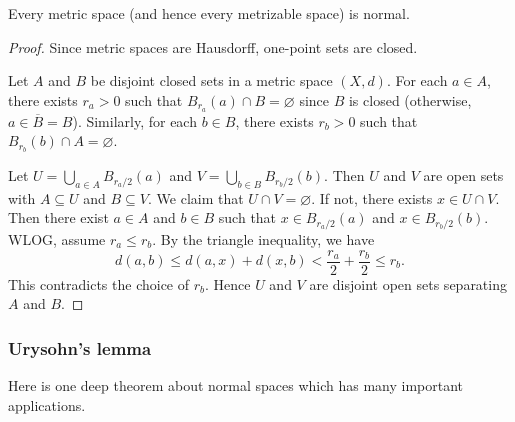 \begin{theorem}
    Every metric space (and hence every metrizable space) is normal. 
\end{theorem}
\begin{proof}
    Since metric spaces are Hausdorff, one-point sets are closed. 

    Let $A$ and $B$ be disjoint closed sets in a metric space $(X,d)$. For each $a\in A$, there exists $r_a>0$ such that $B_{r_a}(a)\cap B=\varnothing$ since $B$ is closed (otherwise, $a\in \overline{B}=B$). Similarly, for each $b\in B$, there exists $r_b>0$ such that $B_{r_b}(b)\cap A=\varnothing$.

    Let $U=\bigcup_{a\in A} B_{r_a/2}(a)$ and $V=\bigcup_{b\in B} B_{r_b/2}(b)$. Then $U$ and $V$ are open sets with $A\subseteq U$ and $B\subseteq V$. We claim that $U\cap V=\varnothing$. If not, there exists $x\in U\cap V$. Then there exist $a\in A$ and $b\in B$ such that $x\in B_{r_a/2}(a)$ and $x\in B_{r_b/2}(b)$.
    WLOG, assume $r_a\le r_b$.
    By the triangle inequality, we have
    \[d(a,b)\le d(a,x)+d(x,b)<\frac{r_a}{2}+\frac{r_b}{2}\le r_b.\]
    This contradicts the choice of $r_b$. Hence $U$ and $V$ are disjoint open sets separating $A$ and $B$.
\end{proof}



\newpage

\subsubsection*{Urysohn's lemma}

Here is one deep theorem about normal spaces which has many important applications.

